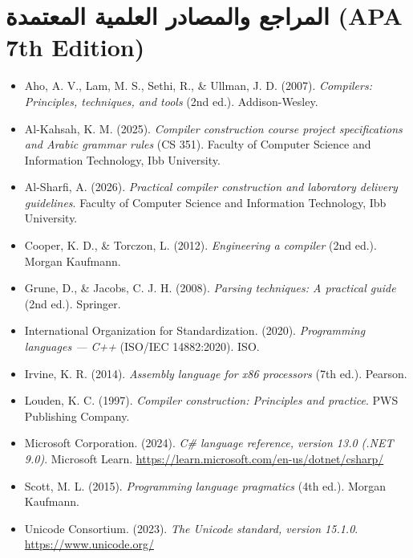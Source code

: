 \documentclass[11pt,a4paper,oneside]{report}
\begin{document}
\chapter*{المراجع والمصادر العلمية المعتمدة (APA 7th Edition)}

\begin{itemize}
    \item Aho, A. V., Lam, M. S., Sethi, R., \& Ullman, J. D. (2007). \textit{Compilers: Principles, techniques, and tools} (2nd ed.). Addison-Wesley.
    \item Al-Kahsah, K. M. (2025). \textit{Compiler construction course project specifications and Arabic grammar rules} (CS 351). Faculty of Computer Science and Information Technology, Ibb University.
    \item Al-Sharfi, A. (2026). \textit{Practical compiler construction and laboratory delivery guidelines}. Faculty of Computer Science and Information Technology, Ibb University.
    \item Cooper, K. D., \& Torczon, L. (2012). \textit{Engineering a compiler} (2nd ed.). Morgan Kaufmann.
    \item Grune, D., \& Jacobs, C. J. H. (2008). \textit{Parsing techniques: A practical guide} (2nd ed.). Springer.
    \item International Organization for Standardization. (2020). \textit{Programming languages --- C++} (ISO/IEC 14882:2020). ISO.
    \item Irvine, K. R. (2014). \textit{Assembly language for x86 processors} (7th ed.). Pearson.
    \item Louden, K. C. (1997). \textit{Compiler construction: Principles and practice}. PWS Publishing Company.
    \item Microsoft Corporation. (2024). \textit{C\# language reference, version 13.0 (.NET 9.0)}. Microsoft Learn. \url{https://learn.microsoft.com/en-us/dotnet/csharp/}
    \item Scott, M. L. (2015). \textit{Programming language pragmatics} (4th ed.). Morgan Kaufmann.
    \item Unicode Consortium. (2023). \textit{The Unicode standard, version 15.1.0}. \url{https://www.unicode.org/}
\end{itemize}
\end{document}
